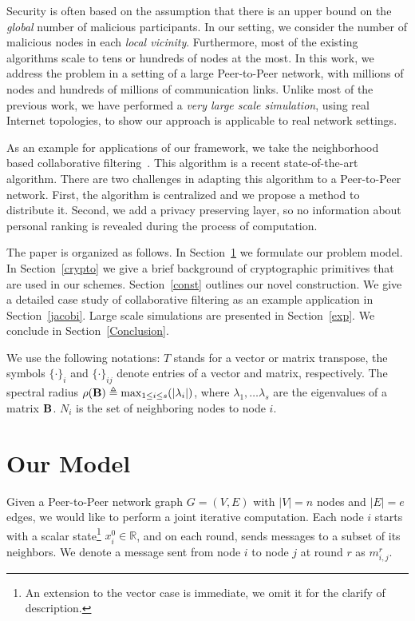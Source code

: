 \documentclass[times, 10pt,twocolumn]{article}
\begin{document}
Security is often based on the assumption that there is an upper
bound on the {\em global} number of malicious participants. In our
setting, we consider the number of malicious nodes in each {\em
local vicinity}. Furthermore, most of the existing algorithms
scale to tens or hundreds of nodes at the most. In this work, we address
the problem in a setting of a large Peer-to-Peer network, with
millions of nodes and hundreds of millions of communication links.
Unlike most of the previous work, we have performed a {\em very
large scale simulation}, using real Internet topologies, to show
our approach is applicable to real network settings.

As an example for applications of our framework, we take the
neighborhood based collaborative filtering~\cite{KorenCF}. This
algorithm is a recent state-of-the-art algorithm. There are two
challenges in adapting this algorithm to a Peer-to-Peer network.
First, the algorithm is centralized and we propose a method to
distribute it. Second, we add a privacy preserving layer, so no
information about personal ranking is revealed during the process
of computation.

 The paper is organized as follows. In Section~\ref{model} we
formulate our problem model. In Section~\ref{crypto} we give a
brief background of cryptographic primitives that are used in our
schemes. Section~\ref{const} outlines our novel construction. We
give a detailed case study of collaborative filtering as an
example application in Section~\ref{jacobi}. Large scale
simulations are presented in Section~\ref{exp}. We conclude in
Section~\ref{Conclusion}.

We use the following notations: $T$ stands for a vector or matrix
transpose, the symbols $\{\cdot\}_{i}$ and $\{\cdot\}_{ij}$ denote
entries of a vector and matrix, respectively. The spectral radius
$\rho({\bf B})\triangleq\max_{1\leq i\leq s}(|\lambda_{i}|)$, where
$\lambda_{1},\ldots\lambda_{s}$ are the eigenvalues of a matrix
${\bf B}$. $N_i$ is the set of neighboring nodes to node $i$.

\section{Our Model}
\label{model} Given a Peer-to-Peer network graph $G=(V, E)$ with
$|V| = n$ nodes and $|E| = e$ edges, we would like to perform a
joint iterative computation. Each node $i$ starts with a scalar
state\footnote{An extension to the vector case is immediate, we
omit it for the clarify of description.} $x_i^0 \in \mathbb{R}$,
and on each round, sends messages to a subset of its neighbors. We
denote a message sent from node $i$ to node $j$ at round $r$ as
$m_{i,j}^r$.
\end{document}
